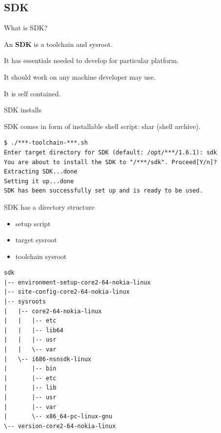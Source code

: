 \documentclass{beamer}
\begin{document}
\subsection{SDK}

\begin{frame}{What is SDK?}
    \begin{block}{}
        An \textbf{SDK} is a toolchain and sysroot.
    \end{block}
    \begin{block}{}
        It has essentials needed to develop for particular platform.
    \end{block}
    \begin{block}{}
        It should work on any machine developer may use.
    \end{block}
    \begin{block}{}
        It is self contained.
    \end{block}
\end{frame}

\begin{frame}[fragile]{SDK installs}
\begin{block}{}
SDK comes in form of installable shell script: shar
(shell archive).
\end{block}
\begin{lstlisting}[style=Console]
$ ./***-toolchain-***.sh
Enter target directory for SDK (default: /opt/***/1.6.1): sdk
You are about to install the SDK to "/***/sdk". Proceed[Y/n]?
Extracting SDK...done
Setting it up...done
SDK has been successfully set up and is ready to be used.
\end{lstlisting}
\end{frame}

\begin{frame}[fragile]{SDK has a directory structure}
\begin{block}{}
\begin{itemize}
\item{setup script}
\item{target sysroot}
\item{toolchain sysroot}
\end{itemize}
\end{block}
\begin{lstlisting}[style=TinyConsole]
sdk
|-- environment-setup-core2-64-nokia-linux
|-- site-config-core2-64-nokia-linux
|-- sysroots
|   |-- core2-64-nokia-linux
|   |   |-- etc
|   |   |-- lib64
|   |   |-- usr
|   |   \-- var
|   \-- i686-nsnsdk-linux
|       |-- bin
|       |-- etc
|       |-- lib
|       |-- usr
|       |-- var
|       \-- x86_64-pc-linux-gnu
\-- version-core2-64-nokia-linux
\end{lstlisting}
\end{frame}
\end{document}
